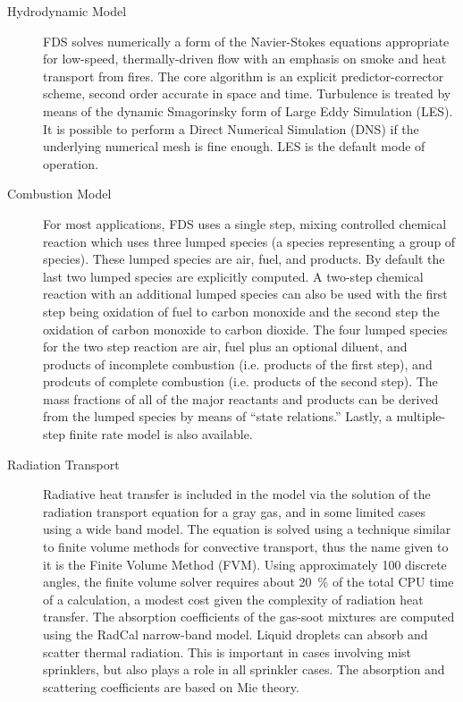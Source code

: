 \documentclass[11pt]{book}
\begin{document}
\begin{description}
\item[Hydrodynamic Model]
FDS solves numerically a form of the Navier-Stokes equations appropriate
for low-speed, thermally-driven flow with an emphasis on
smoke and heat transport from fires. The core algorithm is an
explicit predictor-corrector scheme, second order accurate in space
and time. Turbulence is treated by means of the dynamic Smagorinsky form of
Large Eddy Simulation (LES). It is possible to perform a Direct
Numerical Simulation (DNS) if the underlying numerical mesh is fine
enough. LES is the default mode of operation.

\item[Combustion Model]
For most applications, FDS uses a single step, mixing controlled chemical reaction which uses three lumped species (a species representing a group of species).  These lumped species are air, fuel, and products. By default the last two lumped species are explicitly
computed. A two-step chemical reaction with an additional lumped species can also be used with the first step being oxidation of fuel to carbon monoxide and the second step the oxidation of carbon monoxide to carbon dioxide.
The four lumped species for the two step reaction are air, fuel plus an optional diluent, and products of incomplete combustion (i.e. products of the first step), and prodcuts of complete combustion (i.e. products of the second step).  The mass fractions of all of the major
reactants and products can be derived from the lumped species by means of
``state relations.''  Lastly, a multiple-step finite rate model is also available.

\item[Radiation Transport] Radiative heat transfer is included in the
model via the solution of the radiation transport equation for a
gray gas, and in some limited cases using a wide band
model.  The equation is solved using a technique similar to finite
volume methods for convective transport, thus the name given to it is
the Finite Volume Method (FVM).  Using approximately 100 discrete
angles, the finite volume solver requires about 20~\% of the total CPU
time of a calculation, a modest cost given the complexity of radiation
heat transfer. The absorption coefficients of the gas-soot mixtures
are computed using the RadCal narrow-band model.  Liquid droplets can
absorb and scatter thermal radiation. This is important in cases
involving mist sprinklers, but also plays a role in all sprinkler
cases.  The absorption and scattering coefficients are based on Mie
theory.


\end{description}
\end{document}
